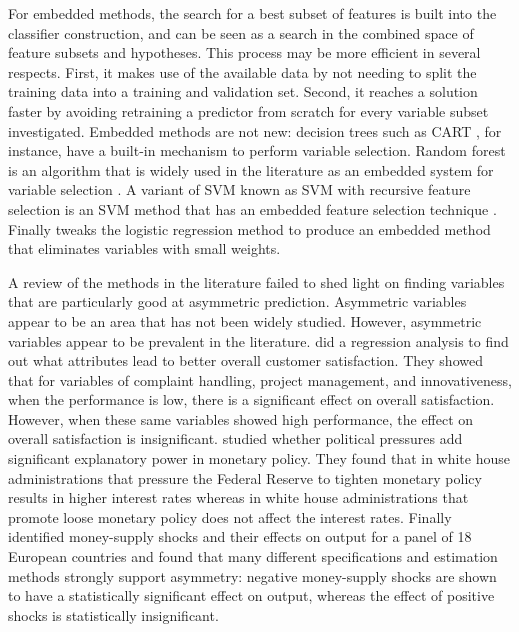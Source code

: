 For embedded methods, the search for a best subset of features is built into the classifier construction, and can be seen as a search in the combined space of feature subsets and hypotheses. This process may be more efficient in several respects. First, it makes use of the available data by not needing to split the training data into a training and validation set. Second, it reaches a solution faster by avoiding retraining a predictor from scratch for every variable subset investigated. Embedded methods are not new: decision trees such as CART \citep{Breiman84}, for instance, have a built-in mechanism to perform variable selection. Random forest is an algorithm that is widely used in the literature as an embedded system for variable selection \citep{Diaz06}\citep{Jiang04}. A variant of SVM known as SVM with recursive feature selection is an SVM method that has an embedded feature selection technique \citep{Guyon02}. Finally \citet{Ma05} tweaks the logistic regression method to produce an embedded method that eliminates variables with small weights.

A review of the methods in the literature failed to shed light on finding variables that are particularly good at asymmetric prediction. Asymmetric variables appear to be an area that has not been widely studied. However, asymmetric variables appear to be prevalent in the literature. \citet{Matzler04} did a regression analysis to find out what attributes lead to better overall customer satisfaction. They showed that for variables of complaint handling, project management, and innovativeness, when the performance is low, there is a significant effect on overall satisfaction. However, when these same variables showed high performance, the effect on overall satisfaction is insignificant. \citet{Froyen97} studied whether political pressures add significant explanatory power in monetary policy. They found that in white house administrations that pressure the Federal Reserve to tighten monetary policy results in higher interest rates whereas in white house administrations that promote loose monetary policy does not affect the interest rates. Finally \citet{Karras97} identified money-supply shocks and their effects on output for a panel of 18 European countries and found that many different specifications and estimation methods strongly support asymmetry: negative money-supply shocks are shown to have a statistically significant effect on output, whereas the effect of positive shocks is statistically insignificant. 









